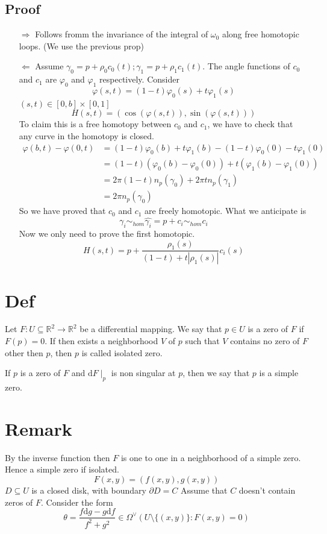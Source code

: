 \documentclass{book}
\newcommand{\abs}[1]{\left\lvert #1 \right\rvert}
\begin{document}
\subsection*{Proof}
\begin{itemize}
    \item[$\Rightarrow$]
    Follows fromm the invariance of the integral of $\omega_0$ along free homotopic loops. (We use the previous prop)
    \item[$\Leftarrow$]
    Assume $\gamma_0=p+\rho_0c_0(t);\gamma_1=p+\rho_1c_1(t)$. The angle functions of $c_0$ and $c_1$ are $\varphi_0$ and $\varphi_1$ respectively. Consider
    $$\varphi(s,t)=(1-t)\varphi_0(s)+t\varphi_1(s)$$
    $(s,t)\in [0,b]\times [0,1]$
    $$H(s,t)=(\cos(\varphi(s,t)),\sin(\varphi(s,t)))$$
    To claim this is a free homotopy between $c_0$ and $c_1$, we have to check that any  curve in the homotopy is closed.
    $$\begin{aligned}
        \varphi(b,t)-\varphi(0,t)&=(1-t)\varphi_0(b)+t\varphi_1(b)-(1-t)\varphi_0(0)-t\varphi_1(0)\\
        &=(1-t)(\varphi_0(b)-\varphi_0(0))+t(\varphi_1(b)-\varphi_1(0))\\
        &=2\pi (1-t)n_p(\gamma_0)+2\pi tn_p(\gamma_1)\\
        &=2\pi n_p(\gamma_0)
    \end{aligned}$$
    So we have proved that $c_0$ and $c_1$ are freely homotopic. What we anticipate is
    $$\gamma_i\sim_{hom}\hat{\gamma_i}=p+c_i\sim_{hom}c_i$$
    Now we only need to prove the first homotopic.
    $$H(s,t)=p+\frac{\rho_1(s)}{(1-t)+t\abs{\rho_1(s)}}c_i(s)$$
\end{itemize}


\section{Def}
Let $F:U\subseteq \mathbb{R}^2\rightarrow\mathbb{R}^2$ be a differential mapping. We say that $p\in U$ is a zero of $F$ if $F(p)=0$. If then exists a neighborhood $V$ of $p$ such that $V$ contains no zero of $F$ other then $p$,  then $p$ is called isolated zero.

If $p$ is a zero of $F$ and $\text{d}F\mid_p$ is non singular at $p$, then we say that $p$ is a simple zero.
\section{Remark}
By the inverse function then $F$ is one to one in a neighborhood of a simple zero. Hence a simple zero if isolated.
$$F(x,y)=(f(x,y),g(x,y))$$
$D\subseteq U$ is a closed disk, with boundary $\partial D=C$ Assume that $C$ doesn't contain zeros of $F$. Consider the form
$$\theta=\frac{f\text{d}g-g\text{d}f}{f^2+g^2}\in \Omega^\vee(U\setminus\{(x,y)\}:F(x,y)=0)$$
\end{document}
